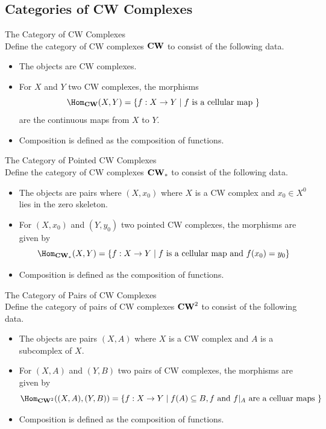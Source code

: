 \documentclass[a4paper]{article}
\begin{document}
\subsection{Categories of CW Complexes}
\begin{defn}{The Category of CW Complexes}{}\\
Define the category of CW complexes $\bold{CW}$ to consist of the following data. 
\begin{itemize}
\item The objects are CW complexes. 
\item For $X$ and $Y$ two CW complexes, the morphisms $$\Hom_{\bold{CW}}(X,Y)=\{f:X\to Y\;|\;f\text{ is a cellular map }\}$$ are the continuous maps from $X$ to $Y$. 
\item Composition is defined as the composition of functions. 
\end{itemize}
\end{defn}

\begin{defn}{The Category of Pointed CW Complexes}{}\\
Define the category of CW complexes $\bold{CW}_\ast$ to consist of the following data. 
\begin{itemize}
\item The objects are pairs where $(X,x_0)$ where $X$ is a CW complex and $x_0\in X^0$ lies in the zero skeleton. 
\item For $(X,x_0)$ and $(Y,y_0)$ two pointed CW complexes, the morphisms are given by $$\Hom_{\bold{CW}_\ast}(X,Y)=\{f:X\to Y\;|\;f\text{ is a cellular map and }f(x_0)=y_0\}$$
\item Composition is defined as the composition of functions. 
\end{itemize}
\end{defn}

\begin{defn}{The Category of Pairs of CW Complexes}{}\\
Define the category of pairs of CW complexes $\bold{CW}^2$ to consist of the following data. 
\begin{itemize}
\item The objects are pairs $(X,A)$ where $X$ is a CW complex and $A$ is a subcomplex of $X$. 
\item For $(X,A)$ and $(Y,B)$ two pairs of CW complexes, the morphisms are given by $$\Hom_{\bold{CW}^2}((X,A),(Y,B))=\{f:X\to Y\;|\;f(A)\subseteq B, f\text{ and }f|_A\text{ are a celluar maps }\}$$
\item Composition is defined as the composition of functions. 
\end{itemize}
\end{defn}
\end{document}
